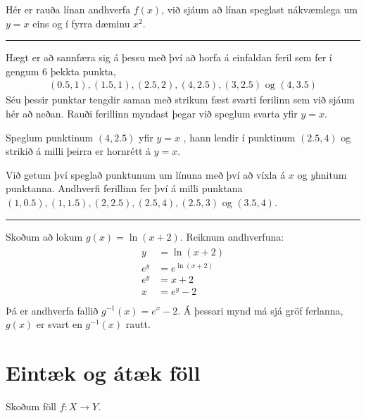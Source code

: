 \documentclass[a4paper,10pt,icelandic]{sphinxmanual}
\begin{document}
Hér er rauða línan andhverfa \(f(x)\), við sjáum að línan speglast nákvæmlega um \(y=x\) eins og í fyrra dæminu \(x^2\).


\bigskip\hrule\bigskip


Hægt er að sannfæra sig á þessu með því að horfa á einfaldan feril sem fer í gengum 6 þekkta punkta,
\begin{equation*}
\begin{split}(0.5,1), (1.5,1), (2.5,2), (4,2.5), (3,2.5) \text{ og } (4,3.5)\end{split}
\end{equation*}
Séu þessir punktar tengdir saman með strikum fæst svarti ferilinn sem við sjáum hér að neðan.
Rauði ferillinn myndast þegar við speglum svarta yfir \(y=x\).

Speglum punktinum \((4, 2.5)\) yfir \(y=x\) , hann lendir í punktinum \((2.5,4)\) og strikið á milli þeirra er hornrétt á \(y=x\).


Við getum því speglað punktunum um línuna með því að víxla á \(x\)\sphinxhyphen{} og \(y\)\sphinxhyphen{}hnitum punktanna.
Andhverfi ferillinn fer því á milli punktana \((1, 0.5), (1,1.5), (2,2.5), (2.5,4), (2.5,3)\) og \((3.5,4)\).


\bigskip\hrule\bigskip


Skoðum að lokum \(g(x) = \ln(x+2)\).
Reiknum andhverfuna:
\begin{equation*}
\begin{split}\begin{aligned}
    y &= \ln(x+2) \\
    e^y&=e^{\ln(x+2)} \\
    e^y &= x+2 \\
    x &= e^y -2\\
\end{aligned}\end{split}
\end{equation*}
Þá er andhverfa fallið \(g^{-1}(x) = e^x -2\).
Á þessari mynd má sjá gröf ferlanna, \(g(x)\) er svart en \(g^{-1}(x)\) rautt.



\section{Eintæk og átæk föll}
\label{\detokenize{Kafli09:eintaek-og-ataek-foll}}
Skoðum föll \(f: X \to Y\).
\end{document}
